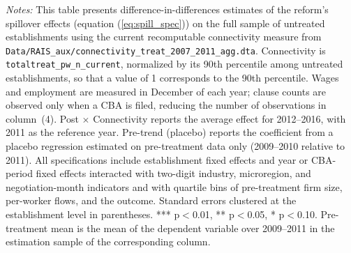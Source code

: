\begin{table}[H]
\begin{minipage}{\linewidth}
\scriptsize\vspace{4pt}
    \textit{Notes:} This table presents difference-in-differences estimates of the reform's spillover effects (equation (\ref{eq:spill_spec})) on the full sample of untreated establishments using the current recomputable connectivity measure from \texttt{Data/RAIS\_aux/connectivity\_treat\_2007\_2011\_agg.dta}. Connectivity is \texttt{totaltreat\_pw\_n\_current}, normalized by its 90th percentile among untreated establishments, so that a value of 1 corresponds to the 90th percentile. Wages and employment are measured in December of each year; clause counts are observed only when a CBA is filed, reducing the number of observations in column~(4). Post $\times$ Connectivity reports the average effect for 2012--2016, with 2011 as the reference year. Pre-trend (placebo) reports the coefficient from a placebo regression estimated on pre-treatment data only (2009--2010 relative to 2011). All specifications include establishment fixed effects and year or CBA-period fixed effects interacted with two-digit industry, microregion, and negotiation-month indicators and with quartile bins of pre-treatment firm size, per-worker flows, and the outcome. Standard errors clustered at the establishment level in parentheses. *** p$<$0.01, ** p$<$0.05, * p$<$0.10. Pre-treatment mean is the mean of the dependent variable over 2009--2011 in the estimation sample of the corresponding column.
\end{minipage}
\end{table}
